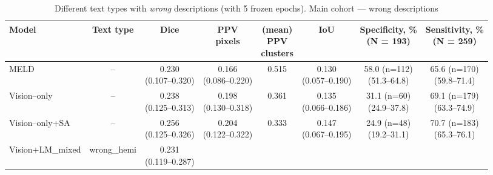 \documentclass[FCD_GNN.tex]{subfiles}
\begin{document}
\begin{table}[H]
\centering
\tiny
\caption{Different text types with \emph{wrong} descriptions (with 5 frozen epochs). Main cohort — wrong descriptions}
\label{tab:wrong_main_cohort_mix_freeze}
\begin{tabular}{lccccccc}
\textbf{Model} &
\textbf{Text type} &
\textbf{Dice} &
\makecell{\textbf{PPV}\\\textbf{pixels}} &
\makecell{\textbf{(mean)} \\\textbf{PPV} \\\textbf{clusters}} & 
\textbf{IoU} & 
\makecell{\textbf{Specificity, \%} \\ (N = 193)}&
\makecell{\textbf{Sensitivity, \%} \\ (N = 259)}\\
\hline
MELD & -- &
\makecell{0.230\\(0.107--0.320)} &
\makecell{0.166\\(0.086--0.220)} &
\colorbox{green!15}{0.515} &
\makecell{0.130\\(0.057--0.190)} &
\makecell{58.0 (n=112) \\ (51.3--64.8)}&
\makecell{65.6 (n=170) \\ (59.8--71.4)} \\
\hline
Vision--only & -- &
\makecell{\colorbox{orange!15}{0.238}\\(0.125--0.313)} &
\makecell{0.198\\(0.130--0.318)} &
0.361 &
\makecell{\colorbox{cyan!15}{0.135}\\(0.066--0.186)} &
\makecell{31.1 (n=60) \\ (24.9--37.8)} &
\makecell{69.1 (n=179) \\ (63.3--74.9)} \\
\hline
Vision--only+SA & -- &
\makecell{\colorbox{green!15}{0.256} \\ (0.125--0.326)} &
\makecell{0.204\\ (0.122--0.322)} &
0.333 &
\makecell{\colorbox{green!15}{0.147}\\ (0.067--0.195)} &
\makecell{24.9 (n=48) \\ (19.2--31.1)} &
\makecell{70.7 (n=183) \\ (65.3--76.1)} \\
\hline
Vision+LM\_mixed & 
wrong\_hemi &
\makecell{0.231 \\ (0.119--0.287)} &

\end{tabular}
\end{table}
\end{document}
